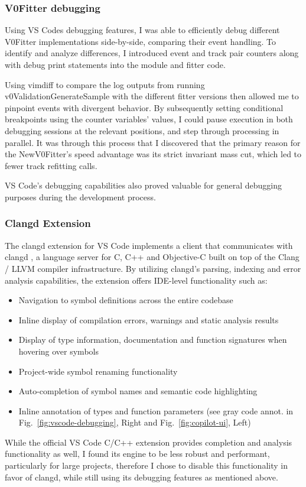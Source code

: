 \subsubsection{V0Fitter debugging}
Using VS Codes debugging features, I was able to efficiently debug different V0Fitter implementations side-by-side, comparing their event handling.
To identify and analyze differences, I introduced event and track pair counters along with debug print statements into the module and fitter code.

Using vimdiff \cite{vim} to compare the log outputs from running v0ValidationGenerateSample with the different fitter versions then allowed me to pinpoint events with divergent behavior.
By subsequently setting conditional breakpoints using the counter variables' values, I could pause execution in both debugging sessions at the relevant positions, and step through processing in parallel.
It was through this process that I discovered that the primary reason for the NewV0Fitter's speed advantage was its strict invariant mass cut, which led to fewer track refitting calls.

VS Code's debugging capabilities also proved valuable for general debugging purposes during the development process.

\subsubsection{Clangd Extension}\label{sec:clangd}
The clangd extension for VS Code \cite{vscode-clangd} implements a client that communicates with clangd \cite{clangd}, a language server for C, C++ and Objective-C built on top of the Clang / LLVM compiler infrastructure.
By utilizing clangd's parsing, indexing and error analysis capabilities, the extension offers IDE-level functionality such as:
\begin{itemize}
  \item Navigation to symbol definitions across the entire codebase
  \item Inline display of compilation errors, warnings and static analysis results
  \item Display of type information, documentation and function signatures when hovering over symbols
  \item Project-wide symbol renaming functionality
  \item Auto-completion of symbol names and semantic code highlighting
  \item Inline annotation of types and function parameters (see gray code annot. in Fig.\ \ref{fig:vscode-debugging}, Right and Fig.\ \ref{fig:copilot-ui}, Left)
\end{itemize}
While the official VS Code C/C++ extension provides completion and analysis functionality as well, I found its engine to be less robust and performant, particularly for large projects, therefore I chose to disable this functionality in favor of clangd, while still using its debugging features as mentioned above.

